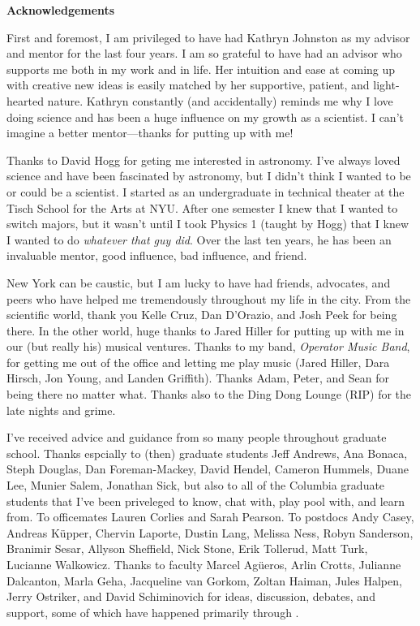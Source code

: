 \newpage

\begin{center}
    {\large \bf Acknowledgements }
\end{center}

\vspace{-0.2cm}

First and foremost, I am privileged to have had Kathryn Johnston as my advisor
and mentor for the last four years. I am so grateful to have had an advisor who
supports me both in my work and in life. Her intuition and ease at coming up
with creative new ideas is easily matched by her supportive, patient, and
light-hearted nature. Kathryn constantly (and accidentally) reminds me why I
love doing science and has been a huge influence on my growth as a scientist. I
can't imagine a better mentor---thanks for putting up with me!

Thanks to David Hogg for geting me interested in astronomy. I've always loved
science and have been fascinated by astronomy, but I didn't think I wanted to be
or could be a scientist. I started as an undergraduate in technical theater at
the Tisch School for the Arts at NYU. After one semester I knew that I wanted to
switch majors, but it wasn't until I took Physics 1 (taught by Hogg) that I knew
I wanted to do \emph{whatever that guy did}. Over the last ten years, he has
been an invaluable mentor, good influence, bad influence, and friend.

New York can be caustic, but I am lucky to have had friends, advocates, and
peers who have helped me tremendously throughout my life in the city. From the
scientific world, thank you Kelle Cruz, Dan D'Orazio, and Josh Peek for being
there. In the other world, huge thanks to Jared Hiller for putting up with me in
our (but really his) musical ventures. Thanks to my band, \emph{Operator Music
Band}, for getting me out of the office and letting me play music (Jared Hiller,
Dara Hirsch, Jon Young, and Landen Griffith). Thanks Adam, Peter, and Sean for
being there no matter what. Thanks also to the Ding Dong Lounge (RIP) for the
late nights and grime.

I've received advice and guidance from so many people throughout graduate
school. Thanks espcially to (then) graduate students Jeff Andrews, Ana Bonaca,
Steph Douglas, Dan Foreman-Mackey, David Hendel, Cameron Hummels, Duane Lee,
Munier Salem, Jonathan Sick, but also to all of the Columbia graduate students
that I've been priveleged to know, chat with, play pool with, and learn from. To
officemates Lauren Corlies and Sarah Pearson. To postdocs Andy Casey, Andreas
K\"upper, Chervin Laporte, Dustin Lang, Melissa Ness, Robyn Sanderson, Branimir
Sesar, Allyson Sheffield, Nick Stone, Erik Tollerud, Matt Turk, Lucianne
Walkowicz. Thanks to faculty Marcel Ag\"ueros, Arlin Crotts, Julianne Dalcanton,
Marla Geha, Jacqueline van Gorkom, Zoltan Haiman, Jules Halpen, Jerry Ostriker,
and David Schiminovich for ideas, discussion, debates, and support, some of
which have happened primarily through .

